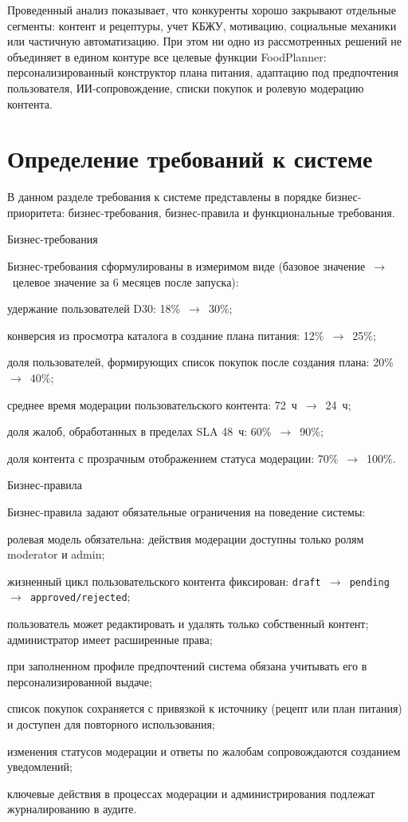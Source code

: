 Проведенный анализ показывает, что конкуренты хорошо закрывают отдельные сегменты: контент и рецептуры, учет КБЖУ, мотивацию, социальные механики или частичную автоматизацию. При этом ни одно из рассмотренных решений не объединяет в едином контуре все целевые функции FoodPlanner: персонализированный конструктор плана питания, адаптацию под предпочтения пользователя, ИИ-сопровождение, списки покупок и ролевую модерацию контента.

\section{Определение требований к системе}

В данном разделе требования к системе представлены в порядке бизнес-приоритета: бизнес-требования, бизнес-правила и функциональные требования.

Бизнес-требования

Бизнес-требования сформулированы в измеримом виде (базовое значение~$\rightarrow$~целевое значение за 6 месяцев после запуска):
\begin{compactlist}
  \item удержание пользователей D30: 18\%~$\rightarrow$~30\%;
  \item конверсия из просмотра каталога в создание плана питания: 12\%~$\rightarrow$~25\%;
  \item доля пользователей, формирующих список покупок после создания плана: 20\%~$\rightarrow$~40\%;
  \item среднее время модерации пользовательского контента: 72~ч~$\rightarrow$~24~ч;
  \item доля жалоб, обработанных в пределах SLA 48~ч: 60\%~$\rightarrow$~90\%;
  \item доля контента с прозрачным отображением статуса модерации: 70\%~$\rightarrow$~100\%.
\end{compactlist}

Бизнес-правила

Бизнес-правила задают обязательные ограничения на поведение системы:
\begin{compactlist}
  \item ролевая модель обязательна: действия модерации доступны только ролям moderator и admin;
  \item жизненный цикл пользовательского контента фиксирован: \texttt{draft~$\rightarrow$~pending~$\rightarrow$~approved/rejected};
  \item пользователь может редактировать и удалять только собственный контент; администратор имеет расширенные права;
  \item при заполненном профиле предпочтений система обязана учитывать его в персонализированной выдаче;
  \item список покупок сохраняется с привязкой к источнику (рецепт или план питания) и доступен для повторного использования;
  \item изменения статусов модерации и ответы по жалобам сопровождаются созданием уведомлений;
  \item ключевые действия в процессах модерации и администрирования подлежат журналированию в аудите.
\end{compactlist}

